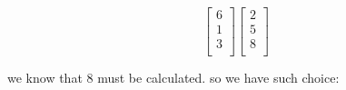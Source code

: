 \documentclass[]{article}
\begin{document}
\[\left[\begin{matrix}

6\\

1\\

3\\

\end{matrix}\right]

\left[\begin{matrix}

2\\

5\\

8\\

\end{matrix}\right]\]

we know that 8 must be calculated. so we have such choice:
\end{document}

